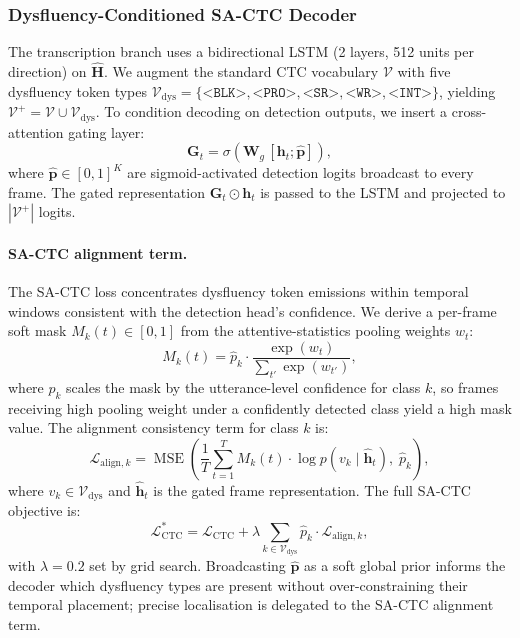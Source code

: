 \documentclass[cameraready]{Interspeech}
\begin{document}
\subsubsection{Dysfluency-Conditioned SA-CTC Decoder}
\label{sec:sactc}

The transcription branch uses a bidirectional LSTM (2 layers, 512 units per
direction) on $\hat{\mathbf{H}}$. We augment the standard CTC vocabulary
$\mathcal{V}$ with five dysfluency token types $\mathcal{V}_\text{dys} =
\{\texttt{<BLK>}, \texttt{<PRO>}, \texttt{<SR>}, \texttt{<WR>},
\texttt{<INT>}\}$, yielding $\mathcal{V}^+ = \mathcal{V} \cup
\mathcal{V}_\text{dys}$. To condition decoding on detection outputs, we insert
a cross-attention gating layer:
\begin{equation}
    \mathbf{G}_t = \sigma\!\left(\mathbf{W}_g \, [\mathbf{h}_t;
    \hat{\mathbf{p}}]\right),
    \label{eq:gate}
\end{equation}
where $\hat{\mathbf{p}} \in [0,1]^K$ are sigmoid-activated detection logits
broadcast to every frame. The gated representation $\mathbf{G}_t \odot
\mathbf{h}_t$ is passed to the LSTM and projected to $|\mathcal{V}^+|$ logits.

\paragraph{SA-CTC alignment term.}
The SA-CTC loss concentrates dysfluency token emissions within temporal windows
consistent with the detection head's confidence. We derive a per-frame soft
mask $M_k(t) \in [0,1]$ from the attentive-statistics pooling weights $w_t$:
\begin{equation}
    M_k(t) = \hat{p}_k \cdot
    \frac{\exp(w_t)}{\sum_{t'} \exp(w_{t'})},
    \label{eq:mask}
\end{equation}
where $\hat{p}_k$ scales the mask by the utterance-level confidence for class
$k$, so frames receiving high pooling weight under a confidently detected class
yield a high mask value. The alignment consistency term for class $k$ is:
\begin{equation}
    \mathcal{L}_{\text{align},k} =
    \operatorname{MSE}\!\!\left(
        \frac{1}{T}\!\sum_{t=1}^{T}\! M_k(t)
        \cdot \log p(v_k \mid \hat{\mathbf{h}}_t),\;
        \hat{p}_k
    \right),
    \label{eq:lalign}
\end{equation}
where $v_k \in \mathcal{V}_\text{dys}$ and $\hat{\mathbf{h}}_t$ is the gated
frame representation. The full SA-CTC objective is:
\begin{equation}
    \mathcal{L}_{\text{CTC}}^{*} = \mathcal{L}_{\text{CTC}} +
    \lambda \sum_{k \in \mathcal{V}_\text{dys}} \hat{p}_k \cdot
    \mathcal{L}_{\text{align},k},
    \label{eq:sactc}
\end{equation}
with $\lambda=0.2$ set by grid search. Broadcasting $\hat{\mathbf{p}}$ as a
soft global prior informs the decoder which dysfluency types are present
without over-constraining their temporal placement; precise localisation is
delegated to the SA-CTC alignment term.
\end{document}
